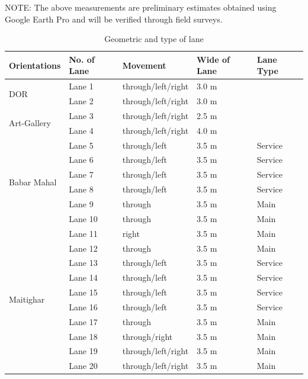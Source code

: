 NOTE: The above measurements are preliminary estimates obtained using Google Earth Pro 
and will be verified through field surveys.

\begin{table}[h]
\centering
\caption{Geometric and type of lane}
\begin{tabular}{|p{3cm}|p{1.5cm}|l|p{1.8cm}|p{1.5cm}|}
\hline
\textbf{Orientations} & \textbf{No. of Lane} & \textbf{Movement} & \textbf{Wide of Lane} & \textbf{Lane Type} \\ \hline

\multirow{2}{*}{DOR}
 & Lane 1 & through/left/right & 3.0 m &  \\ \cline{2-5}
 & Lane 2 & through/left/right & 3.0 m &  \\ \hline

\multirow{2}{*}{Art-Gallery}
 & Lane 3 & through/left/right & 2.5 m &  \\ \cline{2-5}
 & Lane 4 & through/left/right & 4.0 m &  \\ \hline

\multirow{6}{*}{Babar Mahal}
 & Lane 5 & through/left & 3.5 m & Service \\ \cline{2-5}
 & Lane 6 & through/left & 3.5 m & Service \\ \cline{2-5}
 & Lane 7 & through/left & 3.5 m & Service \\ \cline{2-5}
 & Lane 8 & through/left & 3.5 m & Service \\ \cline{2-5}
 & Lane 9 & through & 3.5 m & Main \\ \cline{2-5}
 & Lane 10 & through & 3.5 m & Main \\ \hline

\multirow{10}{*}{Maitighar}
 & Lane 11 & right & 3.5 m & Main \\ \cline{2-5}
 & Lane 12 & through & 3.5 m & Main \\ \cline{2-5}
 & Lane 13 & through/left & 3.5 m & Service \\ \cline{2-5}
 & Lane 14 & through/left & 3.5 m & Service \\ \cline{2-5}
 & Lane 15 & through/left & 3.5 m & Service \\ \cline{2-5}
 & Lane 16 & through/left & 3.5 m & Service \\ \cline{2-5}
 & Lane 17 & through & 3.5 m & Main \\ \cline{2-5}
 & Lane 18 & through/right & 3.5 m & Main \\ \cline{2-5}
 & Lane 19 & through/left/right & 3.5 m & Main \\ \cline{2-5}
 & Lane 20 & through/left/right & 3.5 m & Main \\ \hline

\end{tabular}
\end{table}

